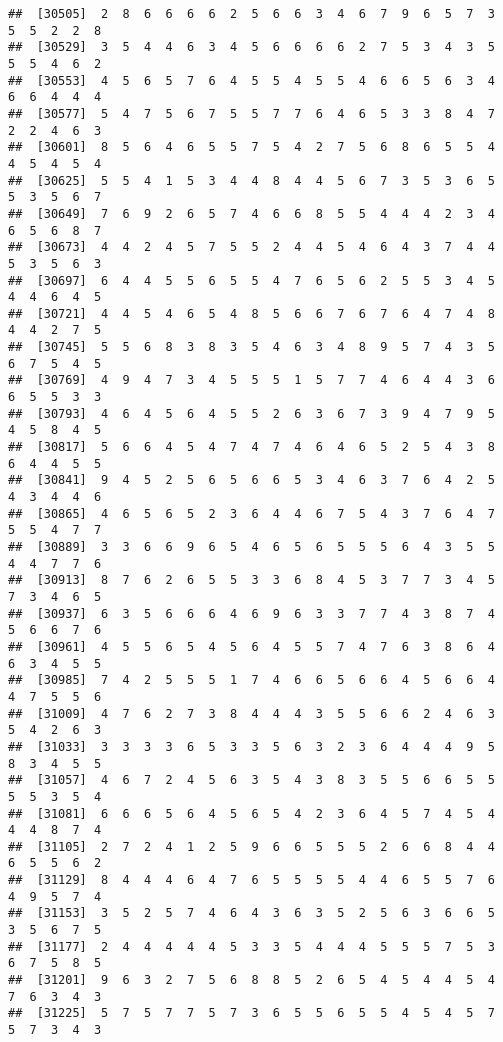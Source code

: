 \documentclass[
]{book}
\begin{document}
\begin{verbatim}
##  [30505]  2  8  6  6  6  6  2  5  6  6  3  4  6  7  9  6  5  7  3  5  5  2  2  8
##  [30529]  3  5  4  4  6  3  4  5  6  6  6  6  2  7  5  3  4  3  5  5  5  4  6  2
##  [30553]  4  5  6  5  7  6  4  5  5  4  5  5  4  6  6  5  6  3  4  6  6  4  4  4
##  [30577]  5  4  7  5  6  7  5  5  7  7  6  4  6  5  3  3  8  4  7  2  2  4  6  3
##  [30601]  8  5  6  4  6  5  5  7  5  4  2  7  5  6  8  6  5  5  4  4  5  4  5  4
##  [30625]  5  5  4  1  5  3  4  4  8  4  4  5  6  7  3  5  3  6  5  5  3  5  6  7
##  [30649]  7  6  9  2  6  5  7  4  6  6  8  5  5  4  4  4  2  3  4  6  5  6  8  7
##  [30673]  4  4  2  4  5  7  5  5  2  4  4  5  4  6  4  3  7  4  4  5  3  5  6  3
##  [30697]  6  4  4  5  5  6  5  5  4  7  6  5  6  2  5  5  3  4  5  4  4  6  4  5
##  [30721]  4  4  5  4  6  5  4  8  5  6  6  7  6  7  6  4  7  4  8  4  4  2  7  5
##  [30745]  5  5  6  8  3  8  3  5  4  6  3  4  8  9  5  7  4  3  5  6  7  5  4  5
##  [30769]  4  9  4  7  3  4  5  5  5  1  5  7  7  4  6  4  4  3  6  6  5  5  3  3
##  [30793]  4  6  4  5  6  4  5  5  2  6  3  6  7  3  9  4  7  9  5  4  5  8  4  5
##  [30817]  5  6  6  4  5  4  7  4  7  4  6  4  6  5  2  5  4  3  8  6  4  4  5  5
##  [30841]  9  4  5  2  5  6  5  6  6  5  3  4  6  3  7  6  4  2  5  4  3  4  4  6
##  [30865]  4  6  5  6  5  2  3  6  4  4  6  7  5  4  3  7  6  4  7  5  5  4  7  7
##  [30889]  3  3  6  6  9  6  5  4  6  5  6  5  5  5  6  4  3  5  5  4  4  7  7  6
##  [30913]  8  7  6  2  6  5  5  3  3  6  8  4  5  3  7  7  3  4  5  7  3  4  6  5
##  [30937]  6  3  5  6  6  6  4  6  9  6  3  3  7  7  4  3  8  7  4  5  6  6  7  6
##  [30961]  4  5  5  6  5  4  5  6  4  5  5  7  4  7  6  3  8  6  4  6  3  4  5  5
##  [30985]  7  4  2  5  5  5  1  7  4  6  6  5  6  6  4  5  6  6  4  4  7  5  5  6
##  [31009]  4  7  6  2  7  3  8  4  4  4  3  5  5  6  6  2  4  6  3  5  4  2  6  3
##  [31033]  3  3  3  3  6  5  3  3  5  6  3  2  3  6  4  4  4  9  5  8  3  4  5  5
##  [31057]  4  6  7  2  4  5  6  3  5  4  3  8  3  5  5  6  6  5  5  5  5  3  5  4
##  [31081]  6  6  6  5  6  4  5  6  5  4  2  3  6  4  5  7  4  5  4  4  4  8  7  4
##  [31105]  2  7  2  4  1  2  5  9  6  6  5  5  5  2  6  6  8  4  4  6  5  5  6  2
##  [31129]  8  4  4  4  6  4  7  6  5  5  5  5  4  4  6  5  5  7  6  4  9  5  7  4
##  [31153]  3  5  2  5  7  4  6  4  3  6  3  5  2  5  6  3  6  6  5  3  5  6  7  5
##  [31177]  2  4  4  4  4  4  5  3  3  5  4  4  4  5  5  5  7  5  3  6  7  5  8  5
##  [31201]  9  6  3  2  7  5  6  8  8  5  2  6  5  4  5  4  4  5  4  7  6  3  4  3
##  [31225]  5  7  5  7  7  5  7  3  6  5  5  6  5  5  4  5  4  5  7  5  7  3  4  3

\end{verbatim}
\end{document}
